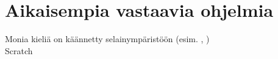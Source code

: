 
\section{Aikaisempia vastaavia ohjelmia}
Monia kieliä on käännetty selainympäristöön (esim. , ) \cite{repl.it}
\\
Scratch